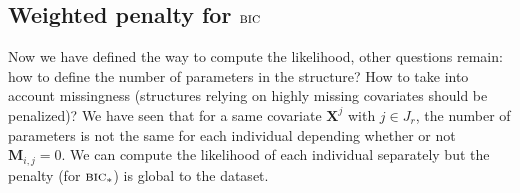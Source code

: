 \documentclass[12pt,a4paper]{report}
\begin{document}
%
%
%
	\subsection{Weighted penalty for $\mbox{{\sc bic}}$}
			Now we have defined the way to compute the likelihood, other questions remain: how to define the number of parameters in the structure? How to take into account missingness (structures relying on highly missing covariates should be penalized)?
			We have seen that for a same covariate $\boldsymbol{X}^j$ with $ j \in J_r$, the number of parameters is not the same for each individual depending whether or not $\boldsymbol{M}_{i,j}=0$. We can compute the likelihood of each individual separately but the penalty (for $\mbox{{\sc bic}}_*$) is global to the dataset. \\
			
\end{document}
